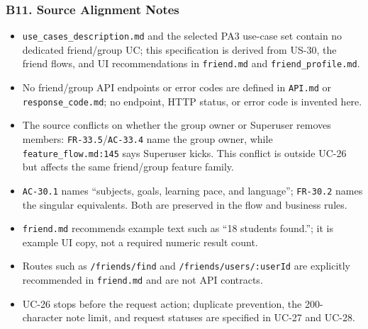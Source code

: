 \documentclass[12pt]{article}
\begin{document}
\hypertarget{sec:b11-source-alignment-notes}{}
\subsubsection*{B11. Source Alignment Notes}
\par\medskip

\begin{itemize}
\item \texttt{use\_cases\_description.md} and the selected PA3 use-case set contain no dedicated friend/group UC; this specification is derived from US-30, the friend flows, and UI recommendations in \texttt{friend.md} and \texttt{friend\_profile.md}.
\item No friend/group API endpoints or error codes are defined in \texttt{API.md} or \texttt{response\_code.md}; no endpoint, HTTP status, or error code is invented here.
\item The source conflicts on whether the group owner or Superuser removes members: \texttt{FR-33.5}/\texttt{AC-33.4} name the group owner, while \texttt{feature\_flow.md:145} says Superuser kicks. This conflict is outside UC-26 but affects the same friend/group feature family.
\item \texttt{AC-30.1} names “subjects, goals, learning pace, and language”; \texttt{FR-30.2} names the singular equivalents. Both are preserved in the flow and business rules.
\item \texttt{friend.md} recommends example text such as “18 students found.”; it is example UI copy, not a required numeric result count.
\item Routes such as \texttt{/friends/find} and \texttt{/friends/users/:userId} are explicitly recommended in \texttt{friend.md} and are not API contracts.
\item UC-26 stops before the request action; duplicate prevention, the 200-character note limit, and request statuses are specified in UC-27 and UC-28.
\end{itemize}
\par\medskip

\par\medskip
\hypertarget{sec:ui-prototype-specimens}{}
\end{document}
